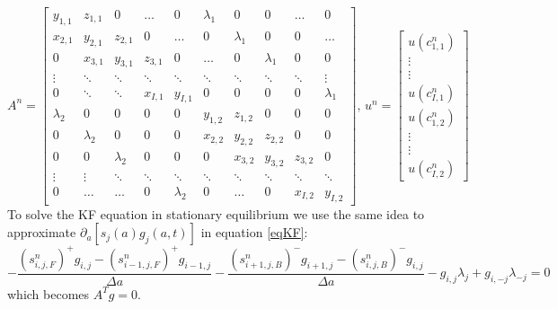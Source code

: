 \documentclass[12pt]{article}
\begin{document}
\begin{equation}\nonumber
A^n=
  \begin{bmatrix}
	y_{1,1} & z_{1,1} & 0 & \dots & 0 & \lambda_1 & 0 & 0 & \dots & 0\\
	x_{2,1} & y_{2,1} & z_{2,1} & 0 & \dots & 0 & \lambda_1 & 0 & 0 &\dots\\
	0 & x_{3,1} & y_{3,1} & z_{3,1} & 0 & \dots & 0 & \lambda_1 & 0 & 0 \\
	\vdots & \ddots & \ddots & \ddots & \ddots & \ddots & \ddots & \ddots & \ddots & \vdots \\
	0 & \ddots & \ddots & x_{I,1} & y_{I,1} & 0 & 0 & 0 & 0 & \lambda_1 \\
	\lambda_2 & 0 &0&0&0& y_{1,2} & z_{1,2} & 0 & 0 & 0\\
	0&\lambda_2 & 0 &0&0& x_{2,2}& y_{2,2} & z_{2,2} & 0 & 0\\
	0&0&\lambda_2 & 0 &0&0& x_{3,2}& y_{3,2} & z_{3,2}  & 0\\
	\vdots & \vdots & \ddots & \ddots & \ddots & \ddots & \ddots & \ddots & \ddots & \ddots \\
	0 & \dots & \dots & 0 & \lambda_2 & 0 & \dots & 0 & x_{I,2} & y_{I,2}
  \end{bmatrix}
\text{,     }
u^n=
  \begin{bmatrix}
	u(c_{1,1}^n)\\
	\vdots\\
	\vdots\\
	u(c_{I,1}^n)\\
	u(c_{1,2}^n)\\
	\vdots\\
	\vdots\\
	u(c_{I,2}^n)
  \end{bmatrix}
\end{equation}
To solve the KF equation in stationary equilibrium we use the same idea to approximate $\partial_a [s_j(a) g_j(a,t)]$ in equation \ref{eqKF}:
\begin{equation}
-\frac{(s_{i,j,F}^n )^{+}g_{i,j}-(s_{i-1,j,F}^n )^{+}g_{i-1,j}}{\Delta a}-\frac{(s_{i+1,j,B}^n )^{-}g_{i+1,j}-(s_{i,j,B}^n )^{-}g_{i,j}}{\Delta a}-g_{i,j}\lambda_j+g_{i,-j}\lambda_{-j}=0
\end{equation}
which becomes $A^{T}g=0$.
\end{document}
